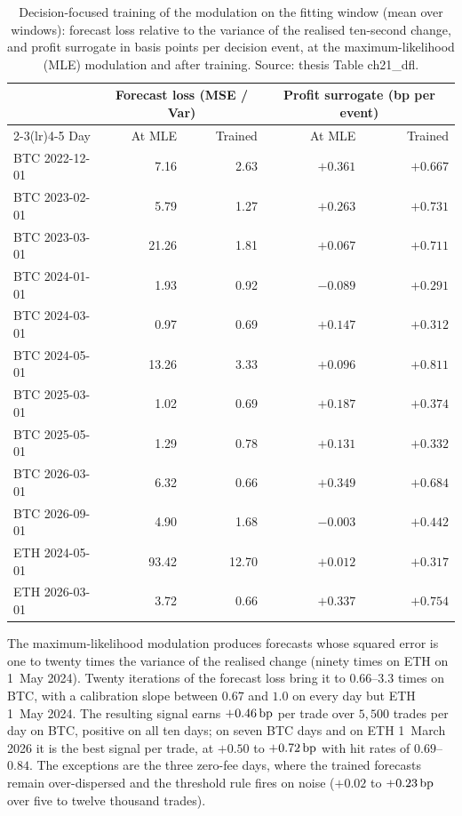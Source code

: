 \documentclass[a4paper,11pt]{article}
\begin{document}
\begin{table}[htbp]
\centering
\caption{Decision-focused training of the modulation on the fitting window (mean over windows): forecast loss relative to the variance of the realised ten-second change, and profit surrogate in basis points per decision event, at the maximum-likelihood (MLE) modulation and after training. Source: thesis Table ch21\_dfl.}
\label{tab:dfl}
\small
\begin{tabular}{@{}lrrrr@{}}
\toprule
 & \multicolumn{2}{c}{Forecast loss (MSE / Var)} & \multicolumn{2}{c}{Profit surrogate (bp per event)} \\
\cmidrule(lr){2-3}\cmidrule(lr){4-5}
Day & At MLE & Trained & At MLE & Trained \\
\midrule
BTC 2022-12-01 & 7.16 & 2.63 & $+0.361$ & $+0.667$ \\
BTC 2023-02-01 & 5.79 & 1.27 & $+0.263$ & $+0.731$ \\
BTC 2023-03-01 & 21.26 & 1.81 & $+0.067$ & $+0.711$ \\
BTC 2024-01-01 & 1.93 & 0.92 & $-0.089$ & $+0.291$ \\
BTC 2024-03-01 & 0.97 & 0.69 & $+0.147$ & $+0.312$ \\
BTC 2024-05-01 & 13.26 & 3.33 & $+0.096$ & $+0.811$ \\
BTC 2025-03-01 & 1.02 & 0.69 & $+0.187$ & $+0.374$ \\
BTC 2025-05-01 & 1.29 & 0.78 & $+0.131$ & $+0.332$ \\
BTC 2026-03-01 & 6.32 & 0.66 & $+0.349$ & $+0.684$ \\
BTC 2026-09-01 & 4.90 & 1.68 & $-0.003$ & $+0.442$ \\
ETH 2024-05-01 & 93.42 & 12.70 & $+0.012$ & $+0.317$ \\
ETH 2026-03-01 & 3.72 & 0.66 & $+0.337$ & $+0.754$ \\
\bottomrule
\end{tabular}
\end{table}

The maximum-likelihood modulation produces forecasts whose squared error is one to twenty times the variance of the realised change (ninety times on ETH on 1~May 2024). Twenty iterations of the forecast loss bring it to $0.66$--$3.3$ times on BTC, with a calibration slope between $0.67$ and $1.0$ on every day but ETH 1~May 2024. The resulting signal earns $+0.46\,\mathrm{bp}$ per trade over $5{,}500$ trades per day on BTC, positive on all ten days; on seven BTC days and on ETH 1~March 2026 it is the best signal per trade, at $+0.50$ to $+0.72\,\mathrm{bp}$ with hit rates of $0.69$--$0.84$. The exceptions are the three zero-fee days, where the trained forecasts remain over-dispersed and the threshold rule fires on noise ($+0.02$ to $+0.23\,\mathrm{bp}$ over five to twelve thousand trades).
\end{document}
